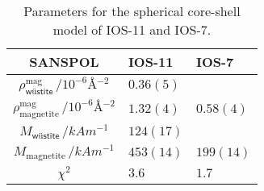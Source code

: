 \documentclass[\main/dresen_thesis.tex]{subfiles}
\begin{document}
    \begin{table}[!htbp]
      \centering
      \caption{\label{tab:looselyPackedNP:nanoparticle:sanspol}Parameters for the spherical core-shell model of IOS-11 and IOS-7.}
      \begin{tabular}{ c | l | l }
        \rule{0pt}{2ex} \textbf{SANSPOL}  & \textbf{IOS-11} & \textbf{IOS-7} \\
        \hline
        \rule{0pt}{2ex} $\rho^\mathrm{mag}_\textsf{w\"ustite} \, / \unit{10^{-6} \angstrom^{-2}}$ & $0.36(5)$ & \\
        \rule{0pt}{2ex} $\rho^\mathrm{mag}_\mathrm{magnetite} \, / \unit{10^{-6} \angstrom^{-2}}$ & $1.32(4)$ & $0.58(4)$\\
        \hline
        \rule{0pt}{2ex} $M_\textsf{w\"ustite} \, / \unit{kA m^{-1}}$                              & $124(17)$ & \\
        \rule{0pt}{2ex} $M_\mathrm{magnetite} \, / \unit{kA m^{-1}}$                              & $453(14)$ & $199(14)$\\
        \hline
        \rule{0pt}{2ex} $\chi^2$                                                                  & $3.6$     & $1.7$\\
        \hline
      \end{tabular}
    \end{table}
\end{document}
